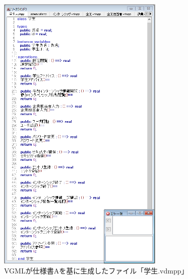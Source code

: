 \begin{figure}[p]
    \begin{center}
    \includegraphics[width=300]{image/indication_vdm3.PNG}
    \caption{VGMLが仕様書Aを基に生成したファイル「学生.vdmpp」}
    \label{fig:indication_vdm3}
    \end{center}
\end{figure}

